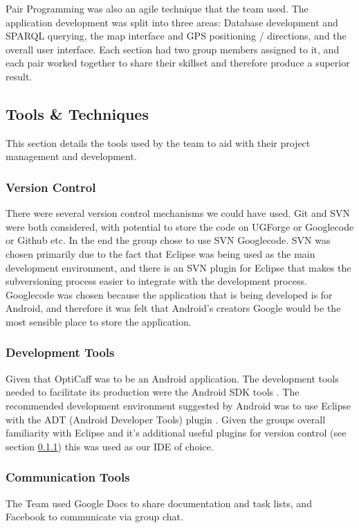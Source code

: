 Pair Programming was also an agile technique that the team used. The application development was split into three areas: Database development and SPARQL querying, the map interface and GPS positioning / directions, and the overall user interface. Each section had two group members assigned to it, and each pair worked together to share their skillset and therefore produce a superior result. 

\subsection{Tools \& Techniques}
This section details the tools used by the team to aid with their project management and development.

\subsubsection{Version Control}
\label{sec:VersionControl}
There were several version control mechanisms we could have used. Git and SVN were both considered, with potential to store the code on UGForge or Googlecode or Github etc. In the end the group chose to use SVN Googlecode. SVN was chosen primarily due to the fact that Eclipse was being used as the main development environment, and there is an SVN plugin for Eclipse that makes the subversioning process easier to integrate with the development process. Googlecode was chosen because the application that is being developed is for Android, and therefore it was felt that Android’s creators Google would be the most sensible place to store the application. 

\subsubsection{Development Tools}
Given that OptiCaff was to be an Android application. The development tools needed to facilitate its production were the Android SDK tools \cite{AndroidSDK}. The recommended development environment suggested by Android was to use Eclipse \cite{Eclipse} with the ADT (Android Developer Tools) plugin \cite{SDKAllOS}. Given the groups overall familiarity with Eclipse and it’s additional useful plugins for version control (see section \ref{sec:VersionControl}) this was used as our IDE of choice.

\subsubsection{Communication Tools}
The Team used Google Docs to share documentation and task lists, and Facebook to communicate via group chat. 
